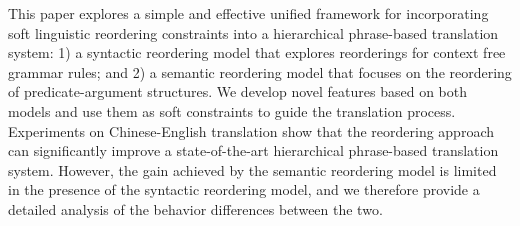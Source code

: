 This paper explores a simple and effective unified framework for incorporating soft linguistic reordering constraints into a hierarchical phrase-based translation system: 1) a syntactic reordering model that explores reorderings for context free grammar rules; and 2) a semantic reordering model that focuses on the reordering of predicate-argument structures. We develop novel features based on both models and use them as soft constraints to guide the translation process. Experiments on Chinese-English translation show that the reordering approach can significantly improve a state-of-the-art hierarchical phrase-based translation system. However, the gain achieved by the semantic reordering model is limited in the presence of the syntactic reordering model, and we therefore provide a detailed analysis of the behavior differences between the two.
